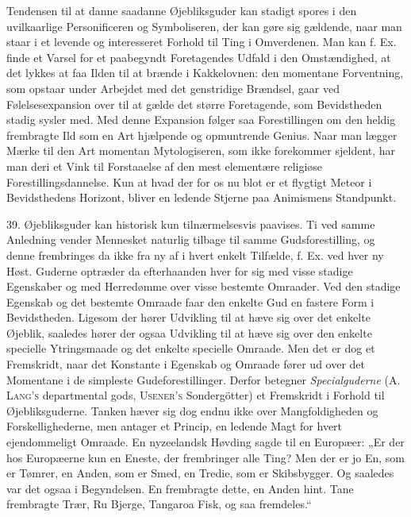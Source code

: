 \documentclass[12pt,a4paper,openany]{book}
\newcommand{\opage}[1]{\marginnote{\footnotesize\textit{[#1]}}}
\begin{document}
Tendensen til at danne saadanne Øjebliksguder kan stadigt spores i den
uvilkaarlige Personificeren og Symboliseren, der kan gøre sig gældende,
naar man staar i et levende og interesseret Forhold til Ting i
Omverdenen. Man kan f. Ex. finde et Varsel for et paabegyndt
Foretagendes Udfald i den Omstændighed, at det lykkes at faa Ilden til
at brænde i Kakkelovnen: den momentane Forventning, som opstaar under
Arbejdet med det genstridige Brændsel, gaar ved Følelsesexpansion over
til at gælde det større Foretagende, som Bevidstheden stadig sysler med.
Med denne Expansion følger saa Forestillingen om den heldig frembragte
Ild som en Art hjælpende og opmuntrende Genius. Naar man lægger Mærke
til den Art momentan Mytologiseren, som ikke forekommer sjeldent, har
man deri et Vink til Forstaaelse af den mest elementære religiøse
Forestillingsdannelse. Kun at hvad der for os nu blot er et flygtigt
Meteor i Bevidsthedens Horizont, bliver en ledende Stjerne paa
Animismens Standpunkt.

39. Øjebliksguder kan historisk kun tilnærmelsesvis paavises. Ti ved
samme Anledning vender Mennesket naturlig tilbage til samme
Gudsforestilling, og denne frembringes da ikke fra ny af i hvert enkelt
Tilfælde, f. Ex. ved hver ny Høst. Guderne optræder da efterhaanden hver
for sig med visse stadige Egenskaber og med Herredømme over visse
bestemte Omraader. Ved den stadige Egenskab og det bestemte Omraade faar
den enkelte Gud
\opage{91}en fastere Form i Bevidstheden. Ligesom der hører Udvikling
til at hæve sig over det enkelte Øjeblik, saaledes hører der ogsaa
Udvikling til at hæve sig over den enkelte specielle Ytringsmaade og det
enkelte specielle Omraade. Men det er dog et Fremskridt, naar det
Konstante i Egenskab og Omraade fører ud over det Momentane i de
simpleste Gudeforestillinger. Derfor betegner \textit{Specialguderne}
(\textsc{A. Lang’s} departmental gods, \textsc{Usener’s} Sondergötter)
et Fremskridt i Forhold til Øjebliksguderne. Tanken hæver sig dog endnu
ikke over Mangfoldigheden og Forskellighederne, men antager et Princip,
en ledende Magt for hvert ejendommeligt Omraade. En nyzeelandsk Høvding
sagde til en Europæer: „Er der hos Europæerne kun en Eneste, der
frembringer alle Ting? Men der er jo En, som er Tømrer, en Anden, som er
Smed, en Tredie, som er Skibsbygger. Og saaledes var det ogsaa i
Begyndelsen. En frembragte dette, en Anden hint. Tane frembragte Trær,
Ru Bjerge, Tangaroa Fisk, og saa fremdeles.“
\end{document}

